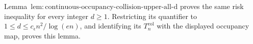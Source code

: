 Lemma~\(\mathrm{lem:continuous\text{-}occupancy\text{-}collision\text{-}upper\text{-}all\text{-}d}\) proves the same risk inequality for every integer \(d\ge1\).  Restricting its quantifier to \(1\le d\le c_{\epsilon}n^2/\log(en)\), and identifying its \(T_n^{\mathrm{col}}\) with the displayed occupancy map, proves this lemma.
